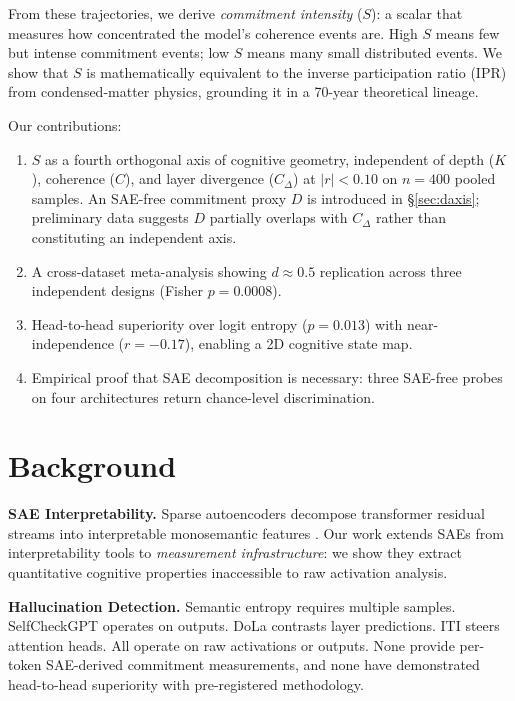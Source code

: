 \documentclass{article}
\begin{document}
From these trajectories, we derive \textit{commitment intensity} ($S$):
a scalar that measures how concentrated the model's coherence events
are. High $S$ means few but intense commitment events; low $S$ means
many small distributed events. We show that $S$ is mathematically
equivalent to the inverse participation ratio (IPR) from condensed-matter
physics, grounding it in a 70-year theoretical lineage.

Our contributions:
\begin{enumerate}
\item $S$ as a fourth orthogonal axis of cognitive geometry, independent
of depth ($K$), coherence ($C$), and layer divergence ($C_\Delta$) at
$|r| < 0.10$ on $n = 400$ pooled samples. An SAE-free commitment
proxy $D$ is introduced in \S\ref{sec:daxis}; preliminary data
suggests $D$ partially overlaps with $C_\Delta$ rather than
constituting an independent axis.
\item A cross-dataset meta-analysis showing $d \approx 0.5$ replication
across three independent designs (Fisher $p = 0.0008$).
\item Head-to-head superiority over logit entropy ($p = 0.013$) with
near-independence ($r = -0.17$), enabling a 2D cognitive state map.
\item Empirical proof that SAE decomposition is necessary: three SAE-free
probes on four architectures return chance-level discrimination.
\end{enumerate}

\section{Background}

\textbf{SAE Interpretability.}
Sparse autoencoders decompose transformer residual streams into
interpretable monosemantic features \citep{cunningham2023sparse,
bricken2023monosemanticity, templeton2024scaling}. Our work extends
SAEs from interpretability tools to \textit{measurement infrastructure}:
we show they extract quantitative cognitive properties inaccessible
to raw activation analysis.

\textbf{Hallucination Detection.}
Semantic entropy \citep{farquhar2024semantic} requires multiple samples.
SelfCheckGPT \citep{manakul2023selfcheckgpt} operates on outputs.
DoLa \citep{chuang2023dola} contrasts layer predictions. ITI
\citep{li2023inference} steers attention heads. All operate on raw
activations or outputs. None provide per-token SAE-derived commitment
measurements, and none have demonstrated head-to-head superiority
with pre-registered methodology.
\end{document}
